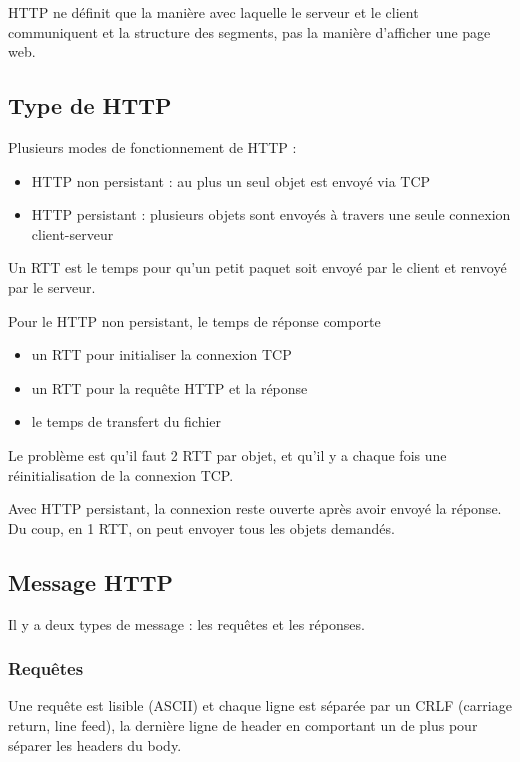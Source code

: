 HTTP ne définit que la manière avec laquelle le serveur et le client communiquent et la structure des segments, pas la manière d'afficher une page web.

	\subsection{Type de HTTP}
	Plusieurs modes de fonctionnement de HTTP :

	\begin{itemize}
		\item HTTP non persistant : au plus un seul objet est envoyé via TCP
		\item HTTP persistant : plusieurs objets sont envoyés à travers une seule connexion client-serveur
	\end{itemize}


	Un RTT est le temps pour qu'un petit paquet soit envoyé par le client et renvoyé par le serveur.

	Pour le HTTP non persistant, le temps de réponse comporte

	\begin{itemize}
		\item un RTT pour initialiser la connexion TCP
		\item un RTT pour la requête HTTP et la réponse
		\item le temps de transfert du fichier
	\end{itemize}
	

	Le problème est qu'il faut 2 RTT par objet, et qu'il y a chaque fois une réinitialisation de la connexion TCP.

	Avec HTTP persistant, la connexion reste ouverte après avoir envoyé la réponse. Du coup, en 1 RTT, on peut envoyer tous les objets demandés.

	\subsection{Message HTTP}

	Il y a deux types de message : les requêtes et les réponses.
	
		\subsubsection{Requêtes}
		
		Une requête est lisible (ASCII) et chaque ligne est séparée par un CRLF (carriage return, line feed), la dernière ligne de header en comportant un de plus pour séparer les headers du body.
		

